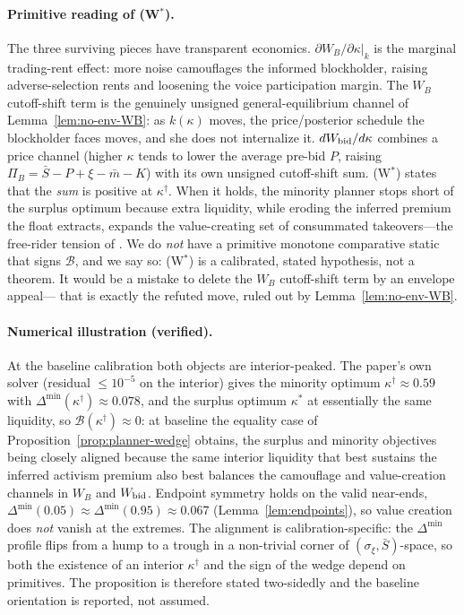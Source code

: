 \documentclass[11pt]{article}
\newcommand{\1}{\mathbf{1}}
\begin{document}
\paragraph{Primitive reading of (W$^{\ast}$).}
The three surviving pieces have transparent economics.
$\partial W_B/\partial\kappa|_k$ is the marginal trading-rent effect: more noise
camouflages the informed blockholder, raising adverse-selection rents and
loosening the voice participation margin. The $W_B$ cutoff-shift term is the
genuinely unsigned general-equilibrium channel of Lemma~\ref{lem:no-env-WB}: as
$k(\kappa)$ moves, the price/posterior schedule the blockholder faces moves, and
she does not internalize it. $dW_{\textup{bid}}/d\kappa$ combines a price channel
(higher $\kappa$ tends to lower the average pre-bid $P$, raising
$\Pi_B=\bar S-P+\xi-\bar m-K$) with its own unsigned cutoff-shift sum. (W$^{\ast}$)
states that the \emph{sum} is positive at $\kappa^{\dagger}$. When it holds, the
minority planner stops short of the surplus optimum because extra liquidity, while
eroding the inferred premium the float extracts, expands the value-creating set of
consummated takeovers---the free-rider tension of \citet{GrossmanHart1980}. We do
\emph{not} have a primitive monotone comparative static that signs $\mathcal B$,
and we say so: (W$^{\ast}$) is a calibrated, stated hypothesis, not a theorem. It
would be a mistake to delete the $W_B$ cutoff-shift term by an envelope appeal---%
that is exactly the refuted move, ruled out by Lemma~\ref{lem:no-env-WB}.

\paragraph{Numerical illustration (verified).}
At the baseline calibration both objects are interior-peaked. The paper's own
solver (residual $\le10^{-5}$ on the interior) gives the minority optimum
$\kappa^{\dagger}\approx0.59$ with $\Delta^{\min}(\kappa^{\dagger})\approx0.078$,
and the surplus optimum $\kappa^{\ast}$ at essentially the same liquidity, so
$\mathcal B(\kappa^{\dagger})\approx0$: at baseline the equality case of
Proposition~\ref{prop:planner-wedge} obtains, the surplus and minority objectives
being closely aligned because the same interior liquidity that best sustains the
inferred activism premium also best balances the camouflage and value-creation
channels in $W_B$ and $W_{\textup{bid}}$. Endpoint symmetry holds on the valid
near-ends, $\Delta^{\min}(0.05)\approx\Delta^{\min}(0.95)\approx0.067$
(Lemma~\ref{lem:endpoints}), so value creation does \emph{not} vanish at the
extremes.
The alignment is calibration-specific: the $\Delta^{\min}$ profile flips from a
hump to a trough in a non-trivial corner of $(\sigma_\xi,\bar S)$-space, so both
the existence of an interior $\kappa^{\dagger}$ and the sign of the wedge depend
on primitives. The proposition is therefore stated two-sidedly and the baseline
orientation is reported, not assumed.
\end{document}
